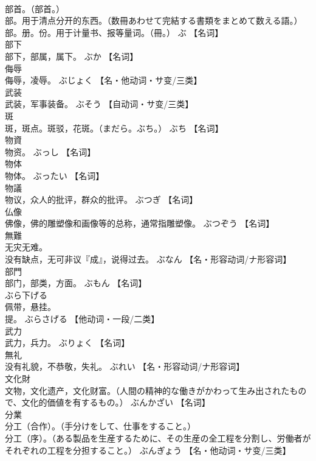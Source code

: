 \documentclass[8pt]{extreport}
\begin{document}
\begin{CJK}{UTF8}{min}
\\	部首。（部首。） 
\\	部。用于清点分开的东西。（数冊あわせて完結する書類をまとめて数える語。） 
\\	部。册。份。用于计量书、报等量词。（冊。）	ぶ		【名词】
\\	部下	
\\	部下，部属，属下。	ぶか		【名词】
\\	侮辱	
\\	侮辱，凌辱。	ぶじょく		【名・他动词・サ变/三类】
\\	武装	
\\	武装，军事装备。	ぶそう		【自动词・サ变/三类】
\\	斑	
\\	斑，斑点。斑驳，花斑。（まだら。ぶち。）	ぶち		【名词】
\\	物資	
\\	物资。	ぶっし		【名词】
\\	物体	
\\	物体。	ぶったい		【名词】
\\	物議	
\\	物议，众人的批评，群众的批评。	ぶつぎ		【名词】
\\	仏像	
\\	佛像，佛的雕塑像和画像等的总称，通常指雕塑像。	ぶつぞう		【名词】
\\	無難	
\\	无灾无难。 
\\	没有缺点，无可非议『成』，说得过去。	ぶなん		【名・形容动词/ナ形容词】
\\	部門	
\\	部门，部类，方面。	ぶもん		【名词】
\\	ぶら下げる	
\\	佩带，悬挂。 
\\	提。	ぶらさげる		【他动词・一段/二类】
\\	武力	
\\	武力，兵力。	ぶりょく		【名词】
\\	無礼	
\\	没有礼貌，不恭敬，失礼。	ぶれい		【名・形容动词/ナ形容词】
\\	文化財	
\\	文物，文化遗产，文化财富。（人間の精神的な働きがかわって生み出されたもので、文化的価値を有するもの。）	ぶんかざい		【名词】
\\	分業	
\\	分工（合作）。（手分けをして、仕事をすること。） 
\\	分工（序）。（ある製品を生産するために、その生産の全工程を分割し、労働者がそれぞれの工程を分担すること。）	ぶんぎょう		【名・他动词・サ变/三类】

\end{CJK}
\end{document}
